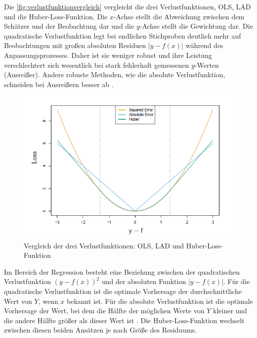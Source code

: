 Die \autoref{fig:verlustfunktionvergleich} vergleicht die drei Verlustfunktionen, \ac{OLS}, \ac{LAD} und die Huber-Loss-Funktion. Die \(x\)-Achse stellt die Abweichung zwischen dem Schätzer und der Beobachtung dar und die \(y\)-Achse stellt die Gewichtung dar. Die quadratische Verlustfunktion legt bei endlichen Stichproben deutlich mehr auf Beobachtungen mit großen absoluten Residuen \(|y-f(x)|\) während des Anpassungsprozesses. Daher ist sie weniger robust und ihre Leistung verschlechtert sich wesentlich bei stark fehlerhaft gemessenen \(y\)-Werten (Ausreißer). Andere robuste Methoden, wie die absolute Verlustfunktion, schneiden bei Ausreißern besser ab \cite{hastie2009elements}. 
\begin{figure}[H]
    \centering
    \includegraphics[width=1\linewidth]{images/3losses.png}
    \caption{Vergleich der drei Verlustfunktionen: \ac{OLS}, \ac{LAD} und Huber-Loss-Funktion \cite{hastie2009elements}}
    \label{fig:verlustfunktionvergleich}
\end{figure} 
\noindent
Im Bereich der Regression besteht eine Beziehung zwischen der quadratischen Verlustfunktion \((y - f(x))^2\) und der absoluten Funktion \(|y - f(x)|\). Für die quadratische Verlustfunktion ist die optimale Vorhersage der durchschnittliche Wert von \(Y\), wenn \(x\) bekannt ist. Für die absolute Verlustfunktion ist die optimale Vorhersage der Wert, bei dem die Hälfte der möglichen Werte von \(Y\) kleiner und die andere Hälfte größer als dieser Wert ist \cite{hastie2009elements}. Die Huber-Loss-Funktion wechselt zwischen diesen beiden Ansätzen je nach Größe des Residuums.
